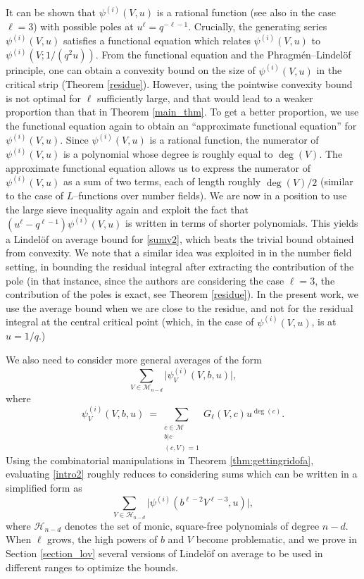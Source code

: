 \documentclass[12pt]{amsart}
\begin{document}
It can be shown that $\psi^{(i)}(V,u)$ is a rational function (see also \cite{DFL} in the case $\ell=3$) with possible poles at $u^{\ell} = q^{-\ell-1}$. Crucially, the generating series $\psi^{(i)}(V,u)$ satisfies a functional equation which relates $\psi^{(i)}(V,u)$ to $\psi^{(i)}(V; 1/(q^2u))$. From the functional equation and the Phragm\'en--Lindel\"{o}f principle, one can obtain a convexity bound on the size of $\psi^{(i)}(V,u)$ in the critical strip (Theorem \ref{residue}). However, using the pointwise convexity bound is not optimal for $\ell$ sufficiently large, and that would lead to a weaker proportion than that in Theorem \ref{main_thm}.
To get a better proportion, we use the functional equation again to obtain an ``approximate functional equation'' for $\psi^{(i)}(V,u)$. Since $\psi^{(i)}(V,u)$ is a rational function, the numerator of $\psi^{(i)}(V,u)$ is a polynomial whose degree is roughly equal to $\deg(V)$. The approximate functional equation allows us to express the numerator of $\psi^{(i)}(V,u)$ as a sum of two terms, each of length roughly $\deg(V)/2$ (similar to the case of  $L$--functions over number fields). We are now in a position to use the large sieve inequality again and exploit the fact that $(u^\ell - q^{\ell-1}) \psi^{(i)}(V,u)$ is written in terms of shorter polynomials. This yields a Lindel\"{o}f on average bound for \eqref{sumv2}, which beats the trivial bound obtained from convexity. We note that a similar idea was exploited in \cite{ddds} in the number field setting, in bounding the residual integral after extracting the contribution of the pole (in that instance, since the authors are considering the case $\ell = 3$, the contribution of the poles is exact, see Theorem \ref{residue}). In the present work, we use the average bound when we are close to the residue, and not for the residual integral at the central critical point (which, in the case of $\psi^{(i)}(V,u)$, is at $u=1/q$.)

We also need to consider more general averages of the form
\begin{equation} \sum_{V \in \mathcal{M}_{n-d}} \Big|  \psi_V^{(i)} (V,b,u)\Big|,
\label{intro2}
\end{equation} where  
$$ \psi_V^{(i)} (V,b,u)\ = \sum_{\substack{c \in \mathcal{M} \\ b|c \\ (c,V)=1}} G_{\ell}(V,c) u^{\deg(c)}.$$
Using the combinatorial manipulations in Theorem \ref{thm:gettingridofa}, evaluating  \eqref{intro2} roughly reduces to considering sums which can be written in a simplified form as 
\begin{equation*}
\sum_{V \in \mathcal{H}_{n-d}} \Big|  \psi^{(i)}(b^{\ell-2} V^{\ell-3},u)\Big|,
\end{equation*}
where $\mathcal{H}_{n-d}$ denotes the set of monic, square-free polynomials of degree $n-d$. When $\ell$ grows, the high powers of $b$ and $V$ become problematic, and we prove in Section \ref{section_lov} several versions of Lindel\"{o}f on average to be used in different ranges to optimize the bounds.
\end{document}
